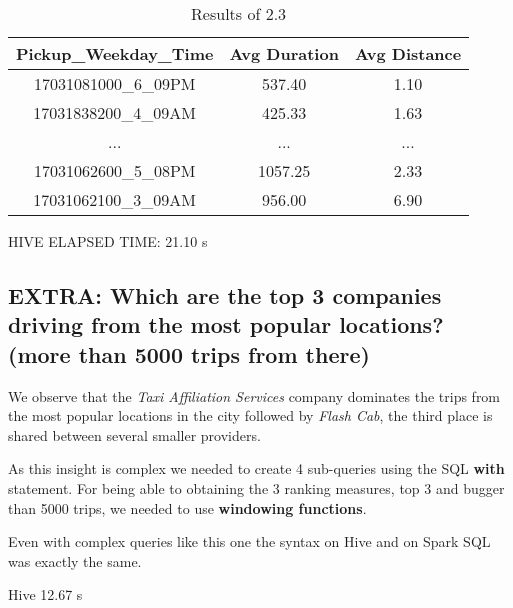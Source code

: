 \documentclass[conference,compsoc]{IEEEtran}
\begin{document}
\begin{table}[!t]
\renewcommand{\arraystretch}{1.3}
\caption{Results of 2.3}
\label{output_2_3}
\centering
\begin{tabular}{c||c|c}
\hline
\bfseries Pickup\_Weekday\_Time & \bfseries Avg Duration & \bfseries Avg Distance\\
\hline\hline
17031081000\_6\_09PM & 537.40 & 1.10\\
17031838200\_4\_09AM & 425.33 & 1.63\\
... & ... & ...\\
17031062600\_5\_08PM & 1057.25 & 2.33\\
17031062100\_3\_09AM & 956.00 & 6.90\\
\hline
\end{tabular}
\end{table}

HIVE ELAPSED TIME: 21.10 s

\subsection{EXTRA: Which are the top 3 companies driving from the most popular locations? (more than 5000 trips from there)}
We observe that the \textit{Taxi Affiliation Services} company dominates the trips from the most popular locations in the city followed by \textit{Flash Cab}, the third place is shared between several smaller providers. \par
As this insight is complex we needed to create 4 sub-queries using the SQL \textbf{with} statement. For being able to obtaining the 3 ranking measures, top 3 and bugger than 5000 trips, we needed to use \textbf{windowing functions}. \par
Even with complex queries like this one the syntax on Hive and on Spark SQL was exactly the same.

Hive 12.67 s
\end{document}
